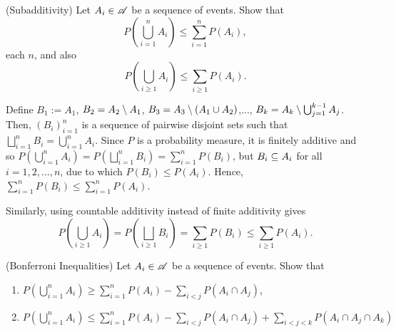 
\begin{problem}
    (Subadditivity) Let $A_i \in \mathscr{A}$ be a sequence of events. Show that 
    \[ P\left(\bigcup_{i = 1}^n A_i\right) \leq \sum_{i = 1}^{n} P(A_i),\]
    each $n$, and also
    \[P\left(\bigcup_{i \geq 1} A_i\right) \leq \sum_{i \geq 1} P(A_i).\]
\end{problem}

\begin{solution}
        Define $B_1 := A_1$, $B_2 = A_2 \setminus A_1$, $B_3 = A_3 \setminus (A_1 \cup A_2)$,..., $B_k = A_k \setminus \bigcup_{j = 1}^{k - 1}A_j$. Then, $(B_i)_{i = 1}^n$ is a sequence of pairwise disjoint sets such that $\bigsqcup_{i = 1}^n B_i = \bigcup_{i = 1}^{n} A_i$. Since $P$ is a probability measure, it is finitely additive and so $ P \left( \bigcup_{i = 1}^{n} A_i \right) = P\left( \bigsqcup_{i = 1}^n B_i \right) = \sum_{i = 1}^n P(B_i)$, but $B_i \subseteq A_i$ for all $i = 1, 2, ..., n$, due to which $P(B_i) \leq P(A_i)$. Hence, $\sum_{i = 1}^n P(B_i) \leq \sum_{i = 1}^n P(A_i)$.

        Similarly, using countable additivity instead of finite additivity gives
        \[ P \left( \bigcup_{i \geq 1} A_i \right) = P \left( \bigsqcup_{i \geq 1} B_i \right) = \sum_{i \geq 1} P(B_i) \leq \sum_{i \geq 1} P(A_i).\]
\end{solution}


\begin{problem}
    (Bonferroni Inequalities) Let $A_i \in \mathscr{A}$ be a sequence of events. Show that
    \begin{enumerate}
        \item $P(\bigcup_{i = 1}^n A_i) \geq \sum_{i = 1}^n P(A_i) - \sum_{i < j} P(A_i \cap A_j)$,
        \item $P(\bigcup_{i = 1}^n A_i) \leq \sum_{i = 1}^n P(A_i) - \sum_{i < j} P(A_i \cap A_j) + \sum_{i < j < k} P(A_i \cap A_j \cap A_k)$
    \end{enumerate}
\end{problem}

